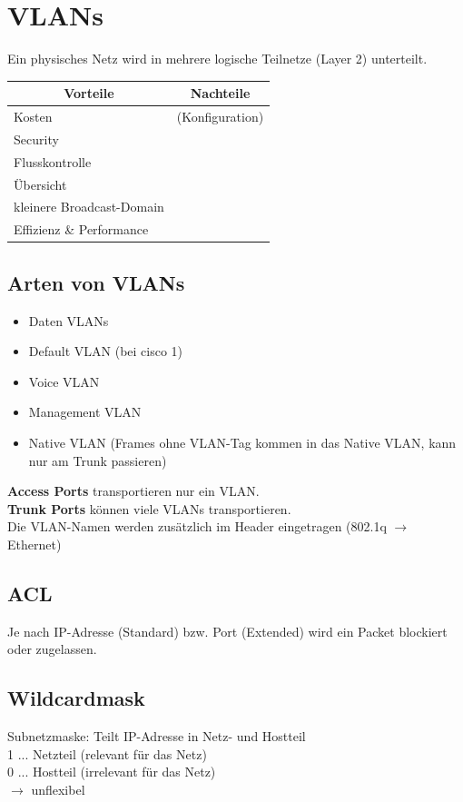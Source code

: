 \section{VLANs}
Ein physisches Netz wird in mehrere logische Teilnetze (Layer 2) unterteilt.
\begin{table}[H]
	\begin{tabular}{l|l}
		\multicolumn{1}{c|}{Vorteile} & \multicolumn{1}{c}{Nachteile} \\
		\hline
		Kosten & (Konfiguration) \\
		Security &  \\
		Flusskontrolle &  \\
		Übersicht &  \\
		kleinere Broadcast-Domain &  \\
		Effizienz \& Performance & 
	\end{tabular}
\end{table}

\subsection*{Arten von VLANs}
\begin{itemize}
	\item Daten VLANs
	\item Default VLAN (bei cisco 1)
	\item Voice VLAN
	\item Management VLAN
	\item Native VLAN (Frames ohne VLAN-Tag kommen in das Native VLAN, kann nur am Trunk passieren)
\end{itemize}

\textbf{Access Ports} transportieren nur ein VLAN. \\
\textbf{Trunk Ports} können viele VLANs transportieren. \\
Die VLAN-Namen werden zusätzlich im Header eingetragen (802.1q $\rightarrow$ Ethernet)

\subsection*{ACL}
Je nach IP-Adresse (Standard) bzw. Port (Extended) wird ein Packet blockiert oder zugelassen.

\subsection*{Wildcardmask}
Subnetzmaske: Teilt IP-Adresse in Netz- und Hostteil \\
1 ... Netzteil (relevant für das Netz) \\
0 ... Hostteil (irrelevant für das Netz) \\
$\rightarrow$ unflexibel

